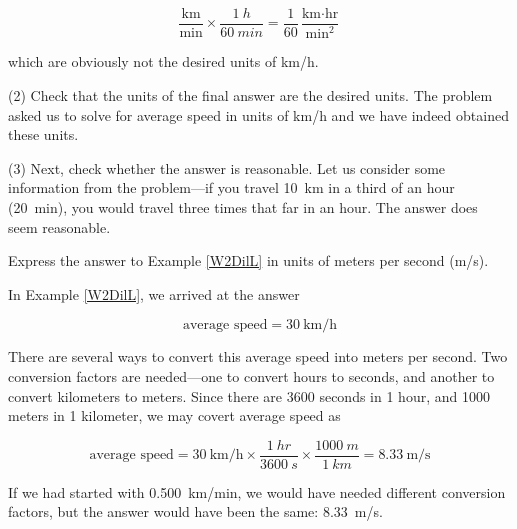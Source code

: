 \documentclass[main-ap-physics.tex]{subfiles}
\begin{document}
\begin{equation*}
    \frac{\text{km}}{\text{min}} \times \frac{\SI{1}{h}}{\SI{60}{min}} = \frac{1}{60} \frac{\text{km} \cdot \text{hr}}{\text{min}^2}
\end{equation*}

which are obviously not the desired units of km/h.

\vspace{1em}

(2) Check that the units of the final answer are the desired units. The problem asked us to solve for average speed in units of km/h and we have indeed obtained these units.

\vspace{1em}

(3) Next, check whether the answer is reasonable. Let us consider some information from the problem---if you travel \SI{10}{km} in a third of an hour (\SI{20}{min}), you would travel three times that far in an hour. The answer does seem reasonable.

\endsolution

\begin{example}
    Express the answer to Example \ref{W2DilL} in units of meters per second (m/s).
\end{example}

\Solution In Example \ref{W2DilL}, we arrived at the answer

\begin{equation*}
    \text{average speed} = \SI[per-mode=fraction]{30}{\kilo\meter\per\hour}
\end{equation*}

There are several ways to convert this average speed into meters per second. Two conversion factors are needed---one to convert hours to seconds, and another to convert kilometers to meters. Since there are 3600 seconds in 1 hour, and 1000 meters in 1 kilometer, we may covert average speed as

\begin{equation*}
    \text{average speed} = \SI[per-mode=fraction]{30}{\kilo\meter\per\hour} \times \frac{\SI{1}{hr}}{\SI{3600}{s}} \times \frac{\SI{1000}{m}}{\SI{1}{km}} = \SI[per-mode=fraction]{8.33}{\meter\per\second}
\end{equation*}

If we had started with \SI{0.500}{km/min}, we would have needed different conversion factors, but the answer would have been the same: \SI{8.33}{m/s}.

\endsolution
\end{document}
